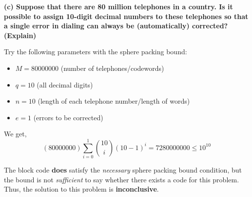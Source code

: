 \textbf{(c) Suppose that there are 80 million telephones in a country.
      Is it possible to assign 10-digit decimal numbers to these
      telephones so that a single error in dialing can always be
      (automatically) corrected? (Explain)}

      Try the following parameters with the sphere packing bound:
      \begin{itemize}
        \item $ M=80000000 $ (number of telephones/codewords)
        \item $ q=10 $ (all decimal digits)
        \item $ n=10 $ (length of each telephone number/length of words)
        \item $ e=1 $ (errors to be corrected)
      \end{itemize}
      We get,
      \[ (80000000)\sum\limits_{i=0}^1 {10 \choose i} (10-1)^i=
        7280000000
        \leq 10^{10} \]

        The block code \textbf{does} satisfy the \emph{necessary}
        sphere packing bound condition, but the bound is not \emph{sufficient}
        to say whether there exists a code for this problem. Thus,
        the solution to this problem is \textbf{inconclusive}.

